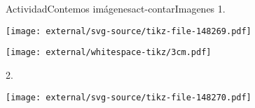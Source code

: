 \documentclass[20pt]{extarticle}
\begin{document}
\begin{activity}{Actividad}{Contemos imágenes}{act-contarImagenes}%
1.%
\begin{image}{0}{1}{0}{}%
\texttt{[image: external/svg-source/tikz-file-148269.pdf]}
\end{image}%
\begin{image}{0}{1}{0}{}%
\texttt{[image: external/whitespace-tikz/3cm.pdf]}
\end{image}%
2.%
\begin{image}{0}{1}{0}{}%
\texttt{[image: external/svg-source/tikz-file-148270.pdf]}
\end{image}%
\end{activity}
\end{document}
